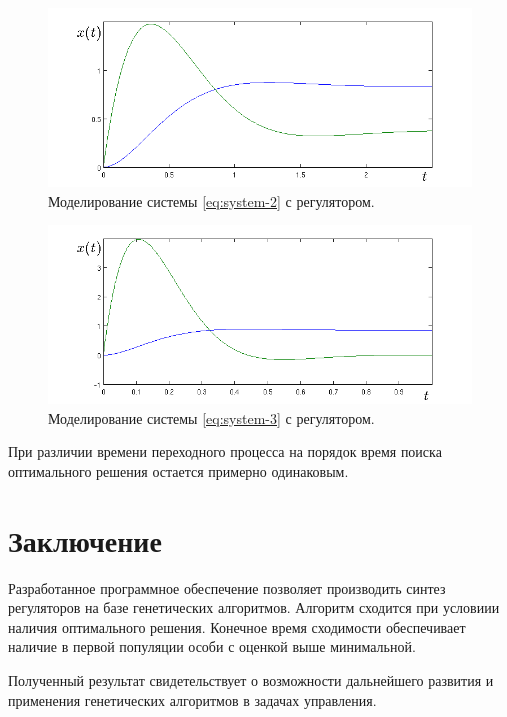 \documentclass[russian,utf8,emptystyle,12pt]{eskdtext}
\begin{document}
		\begin{figure}[h]
		    \centering
		    \includegraphics[scale=0.65]{result_2.png}
		    \caption{Моделирование системы \ref{eq:system-2} с регулятором.}
		    \label{fig:result-2}
		\end{figure}
		    
		\begin{figure}[h]
		    \centering
		    \includegraphics[scale=0.65]{result_3.png}
		    \caption{Моделирование системы \ref{eq:system-3} с регулятором.}
		    \label{fig:result-3}
		\end{figure}
        
    	При различии времени переходного процесса на порядок время поиска оптимального решения остается примерно одинаковым.
        


	\section*{Заключение}
    
    	Разработанное программное обеспечение позволяет производить синтез регуляторов на базе генетических алгоритмов. Алгоритм сходится при условиии наличия оптимального решения. Конечное время сходимости обеспечивает наличие в первой популяции особи с оценкой выше минимальной.
    
    	Полученный результат свидетельствует о возможности дальнейшего развития и применения генетических алгоритмов в задачах управления.
    


	{}
	
  
\end{document}
